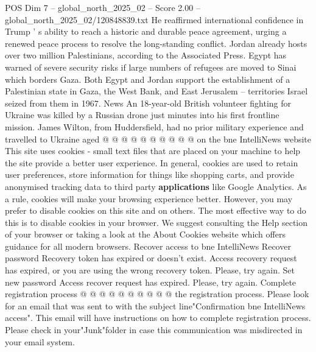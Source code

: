 \begin{textsample}{POS Dim 7 – global\_north\_2025\_02 – Score 2.00 – global\_north\_2025\_02/120848839.txt}
He reaffirmed international confidence in Trump ' s ability to reach a historic and durable peace agreement, urging a renewed peace process to resolve the long-standing conflict.
Jordan already hosts over two million Palestinians, according to the Associated Press.
Egypt has warned of severe security risks if large numbers of refugees are moved to Sinai which borders Gaza.
Both Egypt and Jordan support the establishment of a Palestinian state in Gaza, the West Bank, and East Jerusalem -- territories Israel seized from them in 1967.
News An 18-year-old British volunteer fighting for Ukraine was killed by a Russian drone just minutes into his first frontline mission.
James Wilton, from Huddersfield, had no prior military experience and travelled to Ukraine aged @ @ @ @ @ @ @ @ @ @ on the bne IntelliNews website This site uses cookies - small text files that are placed on your machine to help the site provide a better user experience.
In general, cookies are used to retain user preferences, store information for things like shopping carts, and provide anonymised tracking data to third party \textbf{applications} like Google Analytics.
As a rule, cookies will make your browsing experience better.
However, you may prefer to disable cookies on this site and on others.
The most effective way to do this is to disable cookies in your browser.
We suggest consulting the Help section of your browser or taking a look at the About Cookies website which offers guidance for all modern browsers.
Recover access to bne IntelliNews Recover password Recovery token has expired or doesn't exist.
Access recovery request has expired, or you are using the wrong recovery token.
Please, try again.
Set new password Access recover request has expired.
Please, try again.
Complete registration process @ @ @ @ @ @ @ @ @ @ the registration process.
Please look for an email that was sent to with the subject line"Confirmation bne IntelliNews access".
This email will have instructions on how to complete registration process.
Please check in your"Junk"folder in case this communication was misdirected in your email system.

\end{textsample}
